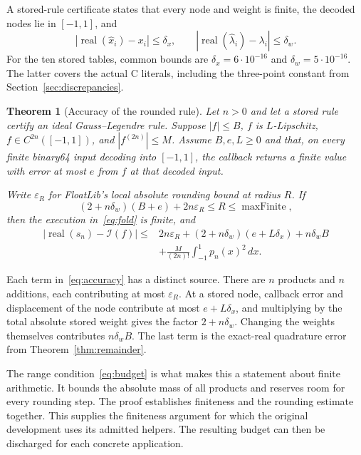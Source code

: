 \documentclass[11pt]{article}
\newtheorem{theorem}{Theorem}[section]
\newcommand{\real}{\operatorname{real}}
\newcommand{\I}{\mathcal{I}}
\begin{document}
A stored-rule certificate states that every node and weight is finite, the
decoded nodes lie in $[-1,1]$, and
\[
 |\real(\widehat x_i)-x_i|\le\delta_x,\qquad
 |\real(\widehat\lambda_i)-\lambda_i|\le\delta_w.
\]
For the ten stored tables, common bounds are $\delta_x=6\cdot10^{-16}$ and
$\delta_w=5\cdot10^{-16}$. The latter covers the actual C literals,
including the three-point constant from Section~\ref{sec:discrepancies}.

\begin{theorem}[Accuracy of the rounded rule]
\label{thm:accuracy}
Let $n>0$ and let a stored rule certify an ideal Gauss--Legendre rule.
Suppose $|f|\le B$, $f$ is $L$-Lipschitz, $f\in C^{2n}([-1,1])$, and
$|f^{(2n)}|\le M$. Assume $B,e,L\ge0$ and that, on every finite binary64
input decoding into $[-1,1]$, the callback returns a finite value with
error at most $e$ from $f$ at that decoded input.

Write $\varepsilon_R$ for FloatLib's local absolute rounding bound at radius
$R$. If
\begin{equation}
 (2+n\delta_w)(B+e)+2n\varepsilon_R
       \le R\le\operatorname{maxFinite},
 \label{eq:budget}
\end{equation}
then the execution in~\eqref{eq:fold} is finite, and
\begin{align}
 |\real(s_n)-\I(f)|
 \le{}&2n\varepsilon_R
       +(2+n\delta_w)(e+L\delta_x)+n\delta_w B
       \nonumber\\
     &+\frac{M}{(2n)!}\int_{-1}^{1}p_n(x)^2\,dx .
 \label{eq:accuracy}
\end{align}
\end{theorem}

Each term in~\eqref{eq:accuracy} has a distinct source. There are $n$
products and $n$ additions, each contributing at most $\varepsilon_R$. At a
stored node, callback error and displacement of the node contribute at most
$e+L\delta_x$, and multiplying by the total absolute stored weight gives the
factor $2+n\delta_w$. Changing the weights themselves contributes
$n\delta_w B$. The last term is the exact-real quadrature error from
Theorem~\ref{thm:remainder}.

The range condition~\eqref{eq:budget} is what makes this a statement about
finite arithmetic. It bounds the absolute mass of all products and reserves
room for every rounding step. The proof establishes finiteness and the
rounding estimate together. This supplies the finiteness argument for which
the original development uses its admitted helpers. The resulting budget
can then be discharged for each concrete application.
\end{document}
